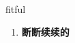 
\begin{frame}
{\huge fitful}
\begin{center}
\begin{enumerate}\Large
  \item \textbf{断断续续的}
\end{enumerate}
\end{center}
\end{frame}
